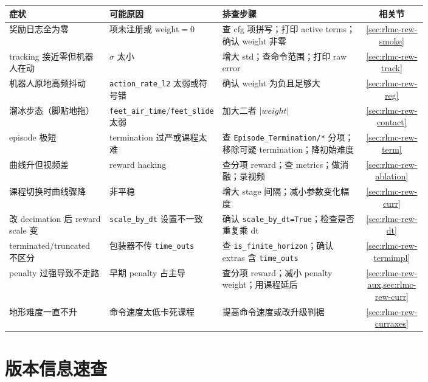 \begin{center}
\small
\begin{tabular}{@{}p{0.24\linewidth}p{0.22\linewidth}p{0.34\linewidth}c@{}}
\toprule
症状 & 可能原因 & 排查步骤 & 相关节 \\
\midrule
奖励日志全为零 & 项未注册或 weight$=0$ & 查 cfg 项拼写；打印 active terms；确认 weight 非零 & \cref{sec:rlmc-rew-smoke} \\
tracking 接近零但机器人在动 & $\sigma$ 太小 & 增大 std；查命令范围；打印 raw error & \cref{sec:rlmc-rew-track} \\
机器人原地高频抖动 & \verb|action_rate_l2| 太弱或符号错 & 确认 weight 为负且足够大 & \cref{sec:rlmc-rew-reg} \\
溜冰步态（脚贴地拖） & \verb|feet_air_time|/\verb|feet_slide| 太弱 & 加大二者 $|weight|$ & \cref{sec:rlmc-rew-contact} \\
episode 极短 & termination 过严或课程太难 & 查 \verb|Episode_Termination/*| 分项；移除可疑 termination；降初始难度 & \cref{sec:rlmc-rew-term} \\
曲线升但视频差 & reward hacking & 查分项 reward；查 metrics；做消融；录视频 & \cref{sec:rlmc-rew-ablation} \\
课程切换时曲线骤降 & 非平稳 & 增大 stage 间隔；减小参数变化幅度 & \cref{sec:rlmc-rew-curr} \\
改 decimation 后 reward scale 变 & \verb|scale_by_dt| 设置不一致 & 确认 \verb|scale_by_dt=True|；检查是否重复乘 dt & \cref{sec:rlmc-rew-dt} \\
terminated/truncated 不区分 & 包装器不传 \verb|time_outs| & 查 \verb|is_finite_horizon|；确认 extras 含 \verb|time_outs| & \cref{sec:rlmc-rew-termimpl} \\
penalty 过强导致不走路 & 早期 penalty 占主导 & 查分项 reward；减小 penalty weight；用课程延后 & \cref{sec:rlmc-rew-aux,sec:rlmc-rew-curr} \\
地形难度一直不升 & 命令速度太低卡死课程 & 提高命令速度或改升级判据 & \cref{sec:rlmc-rew-curraxes} \\
\bottomrule
\end{tabular}
\end{center}

\section*{版本信息速查}
\label{sec:rlmc-rew-version}

